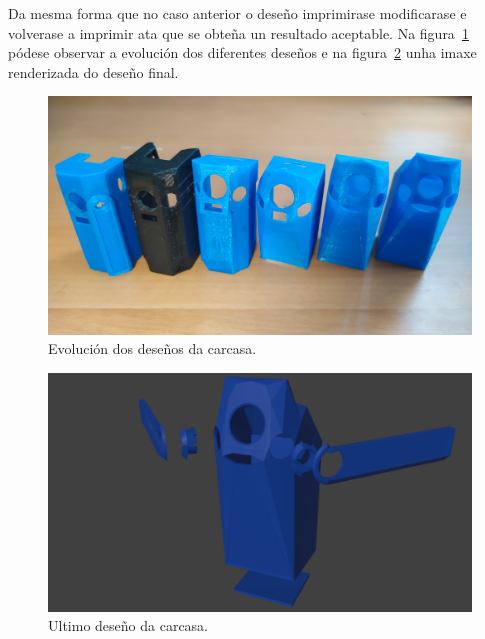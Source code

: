     Da mesma forma que no caso anterior o deseño imprimirase modificarase e volverase a imprimir ata que se obteña un resultado aceptable. Na figura~\ref{fig:evolucion_carcasa} pódese observar a evolución dos diferentes deseños e na figura~\ref{fig:carcasa} unha imaxe renderizada do deseño final.


    \begin{figure}[tbp]
      \centering
      \includegraphics[scale=.1]{imaxes/evolucion-carcasa.jpg}
      \caption{Evolución dos deseños da carcasa.}
      \label{fig:evolucion_carcasa}
    \end{figure}

    \begin{figure}[tbp]
      \centering
      \includegraphics[scale=.4]{imaxes/carcasa.png}
      \caption{Ultimo deseño da carcasa.}
      \label{fig:carcasa}
    \end{figure}

